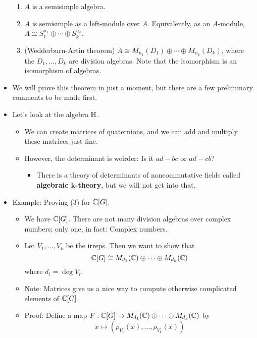 \documentclass[../notes.tex]{subfiles}
\begin{document}
\begin{itemize}
\begin{enumerate}
        \item $A$ is a semisimple algebra.
        \item $A$ is semisimple as a left-module over $A$. Equivalently, as an $A$-module, $A\cong S_1^{n_1}\oplus\cdots\oplus S_k^{n_k}$.
        \item (Wedderburn-Artin theorem) $A\cong M_{n_1}(D_1)\oplus\cdots\oplus M_{n_k}(D_k)$, where the $D_1,\dots,D_k$ are division algebras. Note that the isomorphism is an isomorphism of algebras.
    \end{enumerate}
    \item We will prove this theorem in just a moment, but there are a few preliminary comments to be made first.
    \item Let's look at the algebra $\mathbb{H}$.
    \begin{itemize}
        \item We can create matrices of quaternions, and we can add and multiply these matrices just fine.
        \item However, the determinant is weirder: Is it $ad-bc$ or $ad-cb$?
        \begin{itemize}
            \item There is a theory of determinants of noncommutative fields called \textbf{algebraic $\bm{k}$-theory}, but we will not get into that.
        \end{itemize}
    \end{itemize}
    \item Example: Proving (3) for $\mathbb{C}[G]$.
    \begin{itemize}
        \item We have $\mathbb{C}[G]$. There are not many division algebras over complex numbers; only one, in fact: Complex numbers.
        \item Let $V_1,\dots,V_k$ be the irreps. Then we want to show that
        \begin{equation*}
            \mathbb{C}[G] \cong M_{d_1}(\mathbb{C})\oplus\cdots\oplus M_{d_k}(\mathbb{C})
        \end{equation*}
        where $d_i=\deg V_i$.
        \item Note: Matrices give us a nice way to compute otherwise complicated elements of $\mathbb{C}[G]$.
        \item Proof: Define a map $F:\mathbb{C}[G]\to M_{d_1}(\mathbb{C})\oplus\cdots\oplus M_{d_k}(\mathbb{C})$ by
        \begin{equation*}
            x \mapsto (\rho_{V_1}(x),\dots,\rho_{V_k}(x))
        \end{equation*}

\end{itemize}
\end{itemize}
\end{document}
